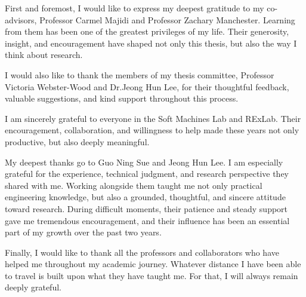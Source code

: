 
\setlength{\parskip}{1em}
\setlength{\parindent}{0em}

\noindent
First and foremost, I would like to express my deepest gratitude to my co-advisors, Professor Carmel Majidi and Professor Zachary Manchester. Learning from them has been one of the greatest privileges of my life. Their generosity, insight, and encouragement have shaped not only this thesis, but also the way I think about research.

I would also like to thank the members of my thesis committee, Professor Victoria Webster-Wood and Dr.Jeong Hun Lee, for their thoughtful feedback, valuable suggestions, and kind support throughout this process.

I am sincerely grateful to everyone in the Soft Machines Lab and RExLab. Their encouragement, collaboration, and willingness to help made these years not only productive, but also deeply meaningful.

My deepest thanks go to Guo Ning Sue and Jeong Hun Lee. I am especially grateful for the experience, technical judgment, and research perspective they shared with me. Working alongside them taught me not only practical engineering knowledge, but also a grounded, thoughtful, and sincere attitude toward research. During difficult moments, their patience and steady support gave me tremendous encouragement, and their influence has been an essential part of my growth over the past two years.

Finally, I would like to thank all the professors and collaborators who have helped me throughout my academic journey. Whatever distance I have been able to travel is built upon what they have taught me. For that, I will always remain deeply grateful.






